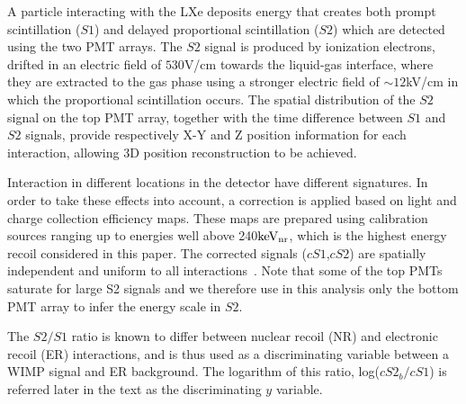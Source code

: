 A particle interacting with the LXe deposits energy that creates both
prompt scintillation ($S1$) and delayed proportional scintillation ($S2$) which are detected using the two PMT arrays. The $S2$ signal is produced by ionization electrons, drifted in an electric field of $530$V/cm towards the liquid-gas interface, where they are extracted to the gas phase using a stronger electric field of $\sim12$kV/cm in which the proportional scintillation occurs. 
The spatial distribution of the $S2$ signal on the top PMT array, together with the time difference between $S1$ and $S2$ signals, provide respectively X-Y and Z position information for each interaction, allowing 3D position reconstruction to be achieved.

Interaction in different locations in the detector have different signatures. In order to take these effects into account, a correction is applied based on light and charge collection efficiency maps. These maps are prepared using calibration sources ranging up to energies well above 240$\mathrm{keV_\mathrm{nr}}$, which is the highest energy recoil considered in this paper. The corrected signals ($cS1$,$cS2$) are spatially independent and uniform to all interactions~\cite{xe100_instr2012}. Note that some of the top PMTs saturate for large S2 signals and we therefore use in this analysis only the bottom PMT array to infer the energy scale in $S2$.

The $S2/S1$ ratio is known to differ between nuclear recoil (NR) and electronic recoil (ER) interactions, and is thus used as a discriminating variable between a WIMP signal and ER background. The logarithm of this ratio, log($cS2_b/cS1$) is referred later in the text as the discriminating $y$ variable.


